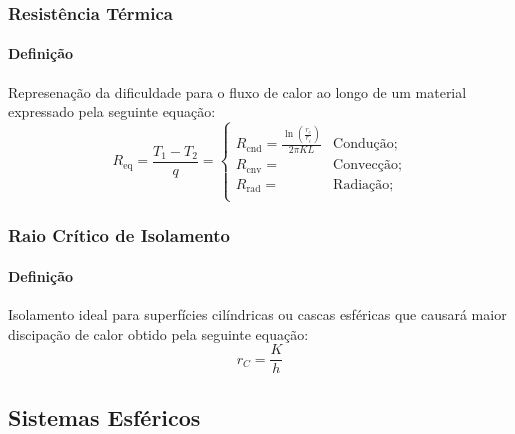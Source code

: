 \documentclass{article}
\begin{document}
        \subsubsection{Resistência Térmica}
            \paragraph{Definição}Represenação da dificuldade para o fluxo de calor ao longo de um material expressado pela seguinte equação:
                \begin{equation}
                    \boxed{
                        R_{\text{eq}} = \frac{T_{1} - T_{2}}{q} = 
                        \begin{cases}
                            R_{\text{cnd}} = \frac{\ln\left(\frac{r_{e}}{r_{i}}\right)}{2\pi KL} & \text{Condução};\\[2.5mm]
                            R_{\text{cnv}} =                                                         & \text{Convecção};\\[2.5mm]
                            R_{\text{rad}} =                                                         & \text{Radiação};\\
                        \end{cases}
                    }
                \end{equation}

        \subsubsection{Raio Crítico de Isolamento}
            \paragraph{Definição}Isolamento ideal para superfícies cilíndricas ou cascas esféricas que causará maior discipação de calor obtido pela seguinte equação:
                \begin{equation}
                    \boxed{
                        r_{C} = \frac{K}{h}
                    }
                \end{equation}

        \subsection{Sistemas Esféricos}
\end{document}
